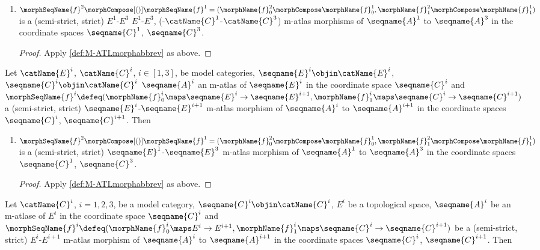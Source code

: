 \documentclass{article}
\begin{document}
\begin{corollary}
\begin{enumerate}[resume]
\item
$
  \morphSeqName{f}^2 \morphCompose[()] \morphSeqName{f}^1 =
    (
      \morphName{f}^2_0 \morphCompose \morphName{f}^1_0,
      \morphName{f}^2_1 \morphCompose \morphName{f}^1_1
    )
$
is a (semi-strict, strict)
$E^1$-$E^3$
\nobreaks
 {
    {$E^1$-$E^3$},
    {(-$\catName{C}^1$-$\catName{C}^3$)}
  }
m-atlas morphisms of $\seqname{A}^1$ to $\seqname{A}^3$ in the
coordinate spaces $\seqname{C}^1$, $\seqname{C}^3$.

\begin{proof}
Apply \cref{def:M-ATLmorphabbrev} as above.
\end{proof}
\end{enumerate}

Let $\catName{E}^i$, $\catName{C}^i$, $i \in [1,3]$, be model categories,
$\seqname{E}^i \objin \catName{E}^i$,
$\seqname{C}^i \objin \catName{C}^i$ $\seqname{A}^i$ an m-atlas
of $\seqname{E}^i$ in the coordinate space $\seqname{C}^i$ and
\nobreaks
  {{
    $
      \morphSeqName{f}^i \defeq
      (
        \morphName{f}^i_0 \maps \seqname{E}^i \to \seqname{E}^{i+1},
        \morphName{f}^i_1 \maps \seqname{C}^i \to \seqname{C}^{i+1}
      )
    $
  }}
a (semi-strict, strict) $\seqname{E}^i$-$\seqname{E}^{i+1}$ m-atlas
morphism of $\seqname{A}^i$ to $\seqname{A}^{i+1}$ in the coordinate
spaces $\seqname{C}^i$, $\seqname{C}^{i+1}$. Then

\begin{enumerate}[resume]
\item
$
  \morphSeqName{f}^2 \morphCompose[()] \morphSeqName{f}^1 =
  (
    \morphName{f}^2_0 \morphCompose \morphName{f}^1_0,
    \morphName{f}^2_1 \morphCompose \morphName{f}^1_1
  )
$
is a (semi-strict, strict) $\seqname{E}^1$-$\seqname{E}^3$ m-atlas
morphism of $\seqname{A}^1$ to $\seqname{A}^3$ in the coordinate spaces
$\seqname{C}^1$, $\seqname{C}^3$.

\begin{proof}
Apply \cref{def:M-ATLmorphabbrev} as above.
\end{proof}
\end{enumerate}

Let $\catName{C}^i$, $i=1,2,3$, be a model category,
$\seqname{C}^i \objin \catName{C}^i$, $E^i$ be a topological space,
$\seqname{A}^i$ be an m-atlase of $E^i$ in the coordinate space
$\seqname{C}^i$ and
\nobreaks
  {{
    $
      \morphSeqName{f}^i \defeq
      (
        \morphName{f}^i_0 \maps E^i \to E^{i+1},
        \morphName{f}^i_1 \maps \seqname{C}^i \to \seqname{C}^{i+1}
      )
    $
  }}
be a (semi-strict, strict)
$E^i$-$E^{i+1}$
m-atlas morphism of
$\seqname{A}^i$ to $\seqname{A}^{i+1}$ in the coordinate spaces
$\seqname{C}^i$, $\seqname{C}^{i+1}$. Then


\end{corollary}
\end{document}

